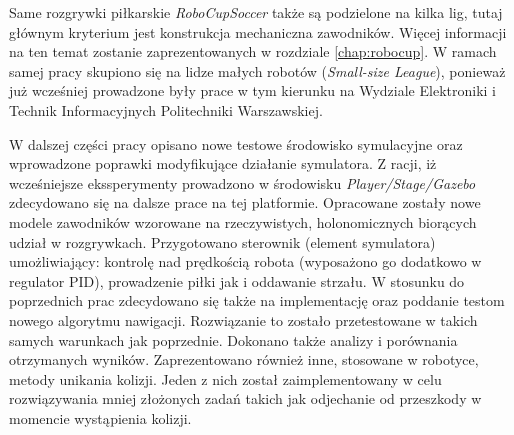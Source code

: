 Same rozgrywki piłkarskie \emph{RoboCupSoccer} także są podzielone na kilka lig, tutaj głównym kryterium jest konstrukcja mechaniczna zawodników. Więcej informacji na ten temat zostanie zaprezentowanych w rozdziale
\ref{chap:robocup}. W ramach samej pracy skupiono się na lidze małych robotów (\emph{Small-size League}), ponieważ już wcześniej prowadzone były prace w tym kierunku na Wydziale Elektroniki i 
Technik Informacyjnych Politechniki Warszawskiej.

W dalszej części pracy opisano nowe testowe środowisko symulacyjne oraz wprowadzone poprawki modyfikujące działanie symulatora.
Z racji, iż wcześniejsze ekssperymenty prowadzono w środowisku \emph{Player/Stage/Gazebo} zdecydowano się na dalsze prace na tej platformie.
Opracowane zostały nowe modele zawodników wzorowane na rzeczywistych, holonomicznych
biorących udział w rozgrywkach. Przygotowano sterownik (element symulatora) umożliwiający: kontrolę nad prędkością robota (wyposażono go dodatkowo w regulator PID), prowadzenie piłki jak i oddawanie strzału.
 W stosunku do poprzednich prac zdecydowano się także na implementację oraz poddanie testom nowego algorytmu nawigacji.  Rozwiązanie to zostało przetestowane w takich samych warunkach 
jak poprzednie. Dokonano także analizy i porównania otrzymanych wyników. Zaprezentowano również inne, stosowane w robotyce, metody unikania kolizji. Jeden z nich został zaimplementowany w celu
rozwiązywania mniej złożonych zadań takich jak odjechanie od przeszkody w momencie wystąpienia kolizji.

